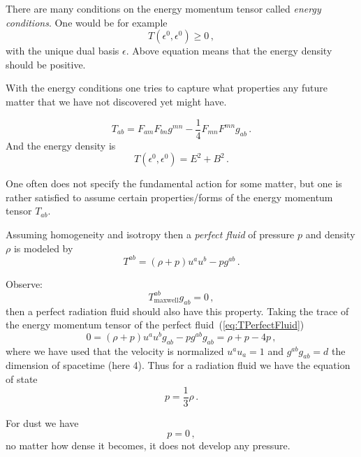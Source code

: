 \begin{note}
    There are many conditions on the energy momentum tensor called \textit{energy conditions}.
    One would be for example
    \begin{equation*}
        T(\epsilon^0, \epsilon^0) \geq 0\,,
    \end{equation*}
    with the unique dual basis $\epsilon$.
    Above equation means that the energy density should be positive.

    With the energy conditions one tries to capture what properties any future matter
    that we have not discovered yet might have.
\end{note}

\begin{example}[(Maxwell)]
    \begin{equation}
        T_{ab} = F_{am}F_{bn}g^{mn} - \frac{1}{4} F_{mn}F^{mn} g_{ab}\,.
    \end{equation}
    And the energy density is
    \begin{equation}
        T(\epsilon^0, \epsilon^0) = E^2 + B^2\,.
    \end{equation}
\end{example}
\begin{note}
    One often does not specify the fundamental action for some matter,
    but one is rather satisfied to assume certain properties/forms of
    the energy momentum tensor $T_{ab}$.
\end{note}
\begin{example}
    Assuming homogeneity and isotropy then a \textit{perfect fluid}
    of pressure $p$ and density $\rho$ is modeled by
    \begin{equation}
        T^{ab} = (\rho + p) u^a u^b - p g^{ab}\,.
        \label{eq:TPerfectFluid}
    \end{equation}
\end{example}
\begin{example}
    Observe:
    \begin{equation}
        T_\text{maxwell}^{ab}g_{ab} = 0\,,
    \end{equation}
    then a perfect radiation fluid should also have this property.
    Taking the trace of the energy momentum tensor of the perfect fluid~(\ref{eq:TPerfectFluid})
    \begin{equation*}
        0 = (\rho + p) u^a u^b g_{ab} - p g^{ab}g_{ab} = \rho + p - 4 p\,,
    \end{equation*}
    where we have used that the velocity is normalized $u^a u_a = 1$ and
    $g^{ab}g_{ab} = d$ the dimension of spacetime (here 4).
    Thus for a radiation fluid we have the equation of state
    \begin{equation}
        p = \frac{1}{3}\rho\,.
    \end{equation}
\end{example}
\begin{example}[(Dust)]
    For dust we have
    \begin{equation*}
        p = 0\,,
    \end{equation*}
    no matter how dense it becomes, it does not develop any pressure.
\end{example}
